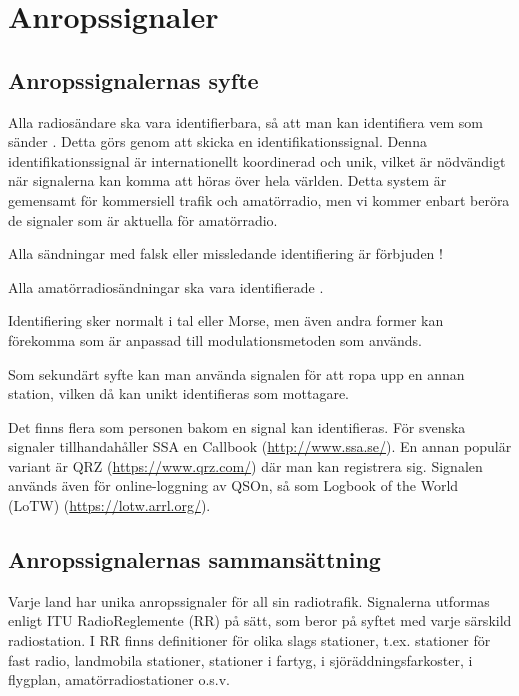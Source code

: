 \section{Anropssignaler}

\subsection{Anropssignalernas syfte}

Alla radiosändare ska vara identifierbara, så att man kan identifiera vem
som sänder \cite[§19.1]{ITU-RR}. Detta görs genom att skicka en
identifikationssignal. Denna identifikationssignal är internationellt
koordinerad och unik, vilket är nödvändigt när signalerna kan komma att
höras över hela världen. Detta system är gemensamt för kommersiell trafik och
amatörradio, men vi kommer enbart beröra de signaler som är aktuella för
amatörradio.

Alla sändningar med falsk eller missledande identifiering är förbjuden \cite[§19.2]{ITU-RR}!

Alla amatörradiosändningar ska vara identifierade \cite[§19.4, §19.5]{ITU-RR}.

Identifiering sker normalt i tal eller Morse, men även andra former kan
förekomma som är anpassad till modulationsmetoden som används.

Som sekundärt syfte kan man använda signalen för att ropa upp en annan station,
vilken då kan unikt identifieras som mottagare.

Det finns flera som personen bakom en signal kan identifieras. För svenska
signaler tillhandahåller SSA en Callbook (\url{http://www.ssa.se/}). En annan
populär variant är QRZ (\url{https://www.qrz.com/}) där man kan registrera sig.
Signalen används även för online-loggning av QSOn, så som Logbook of the World (LoTW) (\url{https://lotw.arrl.org/}).

\subsection{Anropssignalernas sammansättning}

Varje land har unika anropssignaler för all sin radiotrafik.
Signalerna utformas enligt ITU RadioReglemente (RR) \cite[§19]{ITU-RR} på sätt,
som beror på syftet med varje särskild radiostation. I RR finns
definitioner för olika slags stationer, t.ex. stationer för fast
radio, landmobila stationer, stationer i fartyg, i
sjöräddningsfarkoster, i flygplan, amatörradiostationer o.s.v.

